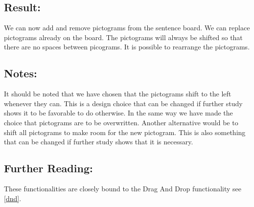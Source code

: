 \subsection*{Result:}
We can now add and remove pictograms from the sentence board. We can replace pictograms already on the board. The pictograms will always be shifted so that there are no spaces between picograms. It is possible to rearrange the pictograms.


\subsection*{Notes:}
It should be noted that we have chosen that the pictograms shift to the left whenever they can. This is a design choice that can be changed if further study shows it to be favorable to do otherwise. 
In the same way we have made the choice that pictograms are to be overwritten. Another alternative would be to shift all pictograms to make room for the new pictogram. This is also something that can be changed if further study shows that it is necessary.


\subsection*{Further Reading:}
These functionalities are closely bound to the Drag And Drop functionality see \autoref{dnd}.